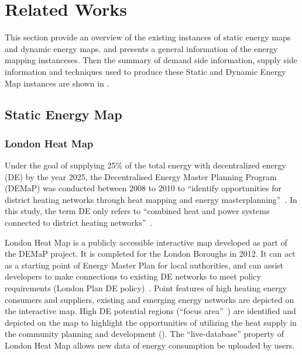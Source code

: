 
\chapter{Related Works} %

\label{Chapter2} %



This section provide an overview of the existing instances of static
energy maps and dynamic energy maps.  and
 presents a general information of the energy mapping
instanceses. Then the summary of demand side information, supply side
information and techniques used to produce these Static and Dynamic
Energy Map instances are shown in .

\section{Static Energy Map}\label{staticEnergyMap}
\subsection{London Heat Map}
Under the goal of supplying 25\% of the total energy with
decentralized energy (DE) by the year 2025, the Decentralised Energy
Master Planning Program (DEMaP) was conducted between 2008 to 2010 to
``identify opportunities for district heating networks through heat
mapping and energy masterplanning''~\cite{londonHeatMap}. In this
study, the term DE only refers to ``combined heat and power systems
connected to district heating
networks''~\cite{decentralHeatMap2011}. 

London Heat Map is a publicly accessible interactive map developed as
part of the DEMaP project. It is completed for the London Boroughs in
2012. It can act as a starting point of Energy Master Plan for local
authorities, and can assist developers to make connections to existing
DE networks to meet policy requirements (London Plan DE
policy)~\cite{decentralHeatMap2011, londonHeatMap}. Point features of
high heating energy consumers and suppliers, existing and emerging
energy networks are depicted on the interactive map. High DE potential
regions (``focus area''~\cite{decentralHeatMap2011}) are identified
and depicted on the map to highlight the opportunities of utilizing
the heat supply in the community planning and development
(). The ``live-database'' property of London Heat
Map allows new data of energy consumption be uploaded by users.

